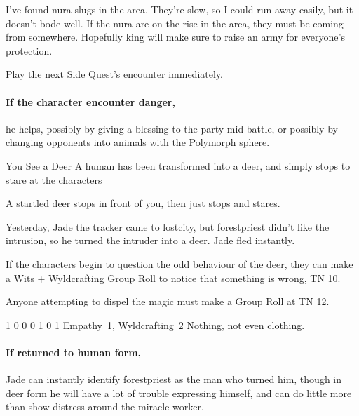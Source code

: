 \begin{multicols}{2}
\begin{speechtext}

  I've found nura slugs in the area.
  They're slow, so I could run away easily, but it doesn't bode well.
  If the nura are on the rise in the area, they must be coming from somewhere.
  Hopefully \gls{king} will make sure to raise an army for everyone's protection.

\end{speechtext}

Play the next Side Quest's encounter immediately.
\paragraph{If the character encounter danger,}
he helps, possibly by giving a blessing to the party mid-battle, or possibly by changing opponents into animals with the Polymorph sphere.

\forestpriest

{You See a Deer}%
{A human has been transformed into a deer, and simply stops to stare at the characters}%

\begin{boxtext}

  A startled deer stops in front of you, then just stops and stares.

\end{boxtext}

Yesterday, Jade the tracker came to \gls{lostcity}, but \gls{forestpriest} didn't like the intrusion, so he turned the intruder into a deer.
Jade fled instantly.

If the characters begin to question the odd behaviour of the deer, they can make a Wits + Wyldcrafting Group Roll to notice that something is wrong, TN 10.

Anyone attempting to dispel the magic must make a Group Roll at TN 12.

  {1}%
  {0}%
  {{0}%
  {0}%
  {1}}%
  {0}%
  {1}%
  {Empathy~1, Wyldcrafting~2}%
  {Nothing, not even clothing.}%
  {}

\paragraph{If returned to human form,}
Jade can instantly identify \gls{forestpriest} as the man who turned him, though in deer form he will have a lot of trouble expressing himself, and can do little more than show distress around the miracle worker.


\end{multicols}
